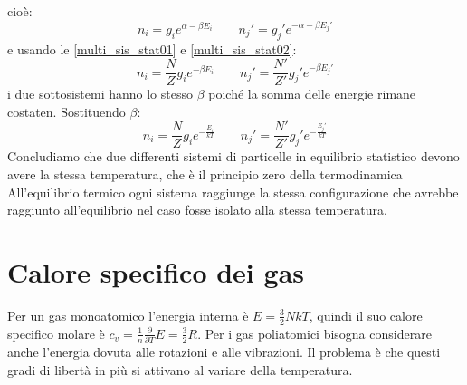 cioè:
\begin{equation}
	n_i=g_ie^{\alpha-\beta E_i}\qquad n_j'=g_j' e^{-\alpha-\beta E_j'}
\end{equation}
e usando le \eqref{multi_sis_stat01} e \eqref{multi_sis_stat02}:
\begin{equation}
	n_i=\frac{N}{Z}g_ie^{-\beta E_i}\qquad n_j'=\frac{N'}{Z'}g_j' e^{-\beta E_j'}
\end{equation}
i due sottosistemi hanno lo stesso $\beta$ poiché la somma delle energie rimane costaten. Sostituendo $\beta$:
\begin{equation}
	n_i=\frac{N}{Z}g_ie^{-\frac{E_i}{kT}}\qquad n_j'=\frac{N'}{Z'}g_j' e^{-\frac{ E_j'}{kT}}
\end{equation}
Concludiamo che due differenti sistemi di particelle in equilibrio statistico devono avere la stessa temperatura, che è il principio zero della termodinamica
All'equilibrio termico ogni sistema raggiunge la stessa configurazione che avrebbe raggiunto all'equilibrio nel caso fosse isolato alla stessa temperatura.


















\chapter{Calore specifico dei gas}
\minitoc
{}
Per un gas monoatomico l'energia interna è $E=\frac{3}{2}NkT$, quindi il suo calore specifico molare è $c_v=\frac{1}{n}\frac{\partial}{\partial T} E=\frac{3}{2}R$. Per i gas poliatomici bisogna considerare anche l'energia dovuta alle rotazioni e alle vibrazioni. Il problema è che questi gradi di libertà in più si attivano al variare della temperatura.

